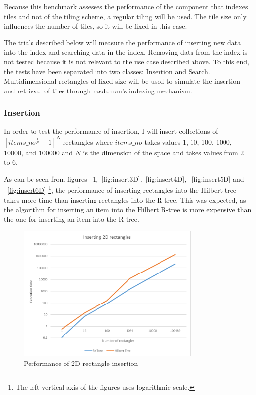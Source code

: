 \documentclass[11pt, a4paper, oneside]{article}
\newcommand{\rtree}{R-tree}
\begin{document}
Because this benchmark assesses the performance of the component that indexes tiles and not of the tiling scheme, a regular tiling will be used. The tile size only influences the number of tiles, so it will be fixed in this case.


 The trials described below will measure the performance of inserting new data into the index and searching data in the index. Removing data from the index is not tested because it is not relevant to the use case described above. To this end, the tests have been separated into two classes: Insertion and Search. Multidimensional rectangles of fixed size will be used to simulate the insertion and retrieval of tiles through rasdaman's indexing mechanism.
 
\subsubsection*{Insertion}
In order to test the performance of insertion, I will insert collections of $[items\_no ^ {\frac{1}{N}} + 1 ]^N $ rectangles where $items\_no$ takes values 1, 10, 100, 1000, 10000, and 100000  and $N$ is the dimension of the space and takes values from 2 to 6.

As can be seen from figures ~\ref{fig:insert2D},~\ref{fig:insert3D},~\ref{fig:insert4D}, ~\ref{fig:insert5D} and ~\ref{fig:insert6D} \footnote{The left vertical axis of the figures uses logarithmic scale.}, the performance of inserting rectangles into the Hilbert tree takes more time than inserting rectangles into the \rtree . This was expected, as the algorithm for inserting an item into the Hilbert R-tree is more expensive than the one for inserting an item into the \rtree.

\begin{figure}[H]
  \centering
    \includegraphics[width=0.8\textwidth]{img/insert2D}
      \caption{Performance of 2D rectangle insertion}
  \label{fig:insert2D}
\end{figure}
\end{document}
